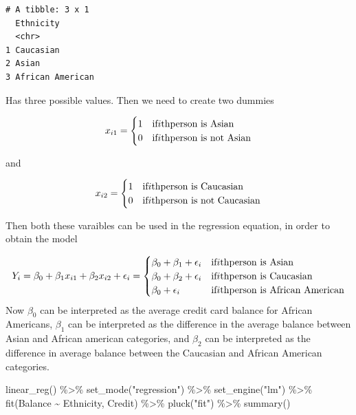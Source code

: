 \documentclass[
  letterpaper,
  DIV=11,
  numbers=noendperiod]{scrreprt}
\newenvironment{Shaded}{\begin{snugshade}}{\end{snugshade}}
\newcommand{\FunctionTok}[1]{\textcolor[rgb]{0.02,0.16,0.49}{#1}}
\newcommand{\NormalTok}[1]{\textcolor[rgb]{0.33,0.33,0.33}{#1}}
\newcommand{\SpecialCharTok}[1]{\textcolor[rgb]{0.00,0.46,0.62}{#1}}
\newcommand{\StringTok}[1]{\textcolor[rgb]{0.00,0.50,0.00}{#1}}
\begin{document}
\begin{verbatim}
# A tibble: 3 x 1
  Ethnicity       
  <chr>           
1 Caucasian       
2 Asian           
3 African American
\end{verbatim}

Has three possible values. Then we need to create two dummies

\[
x_{i1} = 
\begin{cases}
1 & \text{if}\space i\text{th}\space \text{person is Asian} \\
0 & \text{if}\space i\text{th}\space \text{person is not Asian} 
\end{cases}
\]

and

\[
x_{i2} = 
\begin{cases}
1 & \text{if}\space i\text{th}\space \text{person is Caucasian} \\
0 & \text{if}\space i\text{th}\space \text{person is not Caucasian} 
\end{cases}
\]

Then both these varaibles can be used in the regression equation, in
order to obtain the model

\[
Y_i = \beta_0 + \beta_1x_{i1} + \beta_2x_{i2} + \epsilon_i = 
\begin{cases}
\beta_0 + \beta_1 + \epsilon_i & \text{if}\space i\text{th}\space \text{person is Asian} \\
\beta_0 + \beta_2 + \epsilon_i & \text{if}\space i\text{th}\space \text{person is Caucasian} \\
\beta_0 + \epsilon_i & \text{if}\space i\text{th}\space \text{person is African American} 
\end{cases}
\] Now \(\beta_0\) can be interpreted as the average credit card balance
for African Americans, \(\beta_1\) can be interpreted as the difference
in the average balance between Asian and African american categories,
and \(\beta_2\) can be interpreted as the difference in average balance
between the Caucasian and African American categories.

\begin{Shaded}
\begin{Highlighting}[]
\FunctionTok{linear\_reg}\NormalTok{() }\SpecialCharTok{\%\textgreater{}\%} 
  \FunctionTok{set\_mode}\NormalTok{(}\StringTok{"regression"}\NormalTok{) }\SpecialCharTok{\%\textgreater{}\%} 
  \FunctionTok{set\_engine}\NormalTok{(}\StringTok{"lm"}\NormalTok{) }\SpecialCharTok{\%\textgreater{}\%} 
  \FunctionTok{fit}\NormalTok{(Balance }\SpecialCharTok{\textasciitilde{}}\NormalTok{ Ethnicity, Credit) }\SpecialCharTok{\%\textgreater{}\%} 
  \FunctionTok{pluck}\NormalTok{(}\StringTok{"fit"}\NormalTok{) }\SpecialCharTok{\%\textgreater{}\%} 
  \FunctionTok{summary}\NormalTok{()}
\end{Highlighting}
\end{Shaded}
\end{document}
